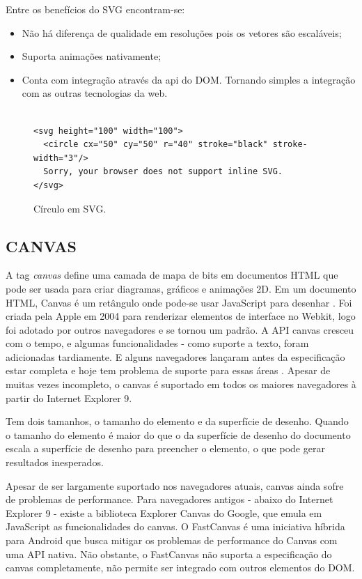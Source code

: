 \documentclass[
12pt,
a4paper,
portuges,
draft
]{report}
\begin{document}
Entre os benefícios do SVG encontram-se:

\begin{itemize}
\item Não há diferença de qualidade em resoluções pois os vetores são escaláveis;
\item Suporta animações nativamente;
\item Conta com integração através da api do DOM. Tornando simples a integração com as outras tecnologias da web.
\end{itemize}

\begin{figure}
\centering
\begin{verbatim}

<svg height="100" width="100">
  <circle cx="50" cy="50" r="40" stroke="black" stroke-width="3"/>
  Sorry, your browser does not support inline SVG.
</svg>

\end{verbatim}
\caption{Círculo em SVG.}
\end{figure}

\subsection{CANVAS}

A tag \textit{canvas} define uma camada de mapa de bits em documentos
HTML que pode ser usada para criar diagramas, gráficos e animações
2D. Em um documento HTML, Canvas é um retângulo onde pode-se usar
JavaScript para desenhar \autocite{diveIntohtml}. Foi criada pela Apple
em 2004 para renderizar elementos de interface no Webkit, logo foi
adotado por outros navegadores e se tornou um padrão. A API canvas
cresceu com o tempo, e algumas funcionalidades - como suporte a texto,
foram adicionadas tardiamente. E alguns navegadores lançaram antes
da especificação estar completa e hoje tem problema de suporte para
essas áreas \autocite{diveIntohtml}. Apesar de muitas vezes incompleto,
o canvas é suportado em todos os maiores navegadores à partir do
Internet Explorer 9.

Tem dois tamanhos, o tamanho do elemento e da superfície de
desenho. Quando o tamanho do elemento é maior do que o da superfície
de desenho do documento escala a superfície de desenho para preencher o
elemento, o que pode gerar resultados inesperados.

Apesar de ser largamente suportado nos navegadores atuais, canvas ainda
sofre de problemas de performance. Para navegadores antigos - abaixo do
Internet Explorer 9 - existe a biblioteca Explorer Canvas do Google, que
emula em JavaScript as funcionalidades do canvas. O FastCanvas é uma
iniciativa híbrida para Android que busca mitigar os problemas de
performance do Canvas com uma API nativa. Não obstante, o FastCanvas
não suporta a especificação do canvas completamente, não permite ser
integrado com outros elementos do DOM.
\end{document}
